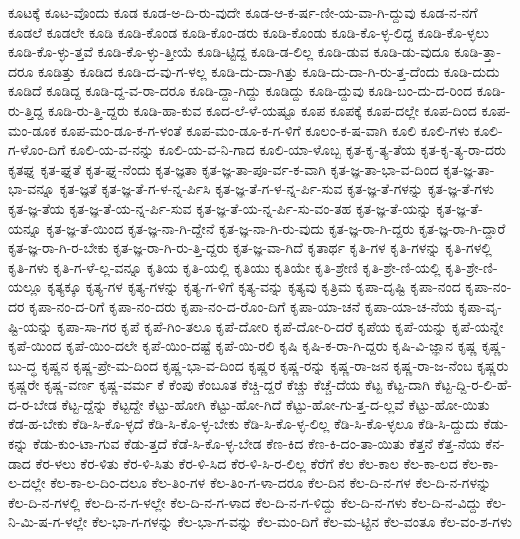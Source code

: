 {ಕೂಟಕ್ಕೆ
ಕೂಟ-ವೊಂದು
ಕೂಡ
ಕೂಡ-ಅ-ದಿ-ರು-ವುದೇ
ಕೂಡ-ಆ-ಕ-ರ್ಷ-ಣೀ-ಯ-ವಾ-ಗಿ-ದ್ದುವು
ಕೂಡ-ನ-ನಗೆ
ಕೂಡಲೆ
ಕೂಡಲೇ
ಕೂಡಿ
ಕೂಡಿ-ಕೊಂಡ
ಕೂಡಿ-ಕೊಂ-ಡರು
ಕೂಡಿ-ಕೊಂಡು
ಕೂಡಿ-ಕೊ-ಳ್ಳ-ಲಿದ್ದ
ಕೂಡಿ-ಕೊ-ಳ್ಳಲು
ಕೂಡಿ-ಕೊ-ಳ್ಳು-ತ್ತವೆ
ಕೂಡಿ-ಕೊ-ಳ್ಳು-ತ್ತೀಯೆ
ಕೂಡಿ-ಟ್ಟಿದ್ದ
ಕೂಡಿ-ಡ-ಲಿಲ್ಲ
ಕೂಡಿ-ಡುವ
ಕೂಡಿ-ಡು-ವುದೂ
ಕೂಡಿ-ತ್ತಾ-ದರೂ
ಕೂಡಿತ್ತು
ಕೂಡಿದ
ಕೂಡಿ-ದ-ವು-ಗ-ಳಲ್ಲ
ಕೂಡಿ-ದು-ದಾ-ಗಿತ್ತು
ಕೂಡಿ-ದು-ದಾ-ಗಿ-ರು-ತ್ತ-ದೆಂದು
ಕೂಡಿ-ದುದು
ಕೂಡಿದೆ
ಕೂಡಿದ್ದ
ಕೂಡಿ-ದ್ದ-ವ-ರಾ-ದರೂ
ಕೂಡಿ-ದ್ದಾ-ಗಿದ್ದು
ಕೂಡಿದ್ದು
ಕೂಡಿ-ದ್ದುವು
ಕೂಡಿ-ಬಂ-ದು-ದ-ರಿಂದ
ಕೂಡಿ-ರು-ತ್ತಿದ್ದ
ಕೂಡಿ-ರು-ತ್ತಿ-ದ್ದರು
ಕೂಡಿ-ಹಾ-ಕುವ
ಕೂದ-ಲೆ-ಳೆ-ಯಷ್ಟೂ
ಕೂಪ
ಕೂಪಕ್ಕೆ
ಕೂಪ-ದಲ್ಲೇ
ಕೂಪ-ದಿಂದ
ಕೂಪ-ಮಂ-ಡೂಕ
ಕೂಪ-ಮಂ-ಡೂ-ಕ-ಗ-ಳಂತೆ
ಕೂಪ-ಮಂ-ಡೂ-ಕ-ಗ-ಳಿಗೆ
ಕೂಲಂ-ಕ-ಷ-ವಾಗಿ
ಕೂಲಿ
ಕೂಲಿ-ಗಳು
ಕೂಲಿ-ಗ-ಳೊಂ-ದಿಗೆ
ಕೂಲಿ-ಯ-ವ-ನನ್ನು
ಕೂಲಿ-ಯ-ವ-ನಿ-ಗಾದ
ಕೂಲಿ-ಯಾ-ಳೊಬ್ಬ
ಕೃತ-ಕೃ-ತ್ಯ-ತೆಯ
ಕೃತ-ಕೃ-ತ್ಯ-ರಾ-ದರು
ಕೃತಘ್ನ
ಕೃತ-ಘ್ನತೆ
ಕೃತ-ಘ್ನ-ನೆಂದು
ಕೃತ-ಜ್ಞತಾ
ಕೃತ-ಜ್ಞ-ತಾ-ಪೂ-ರ್ವ-ಕ-ವಾಗಿ
ಕೃತ-ಜ್ಞ-ತಾ-ಭಾ-ವ-ದಿಂದ
ಕೃತ-ಜ್ಞ-ತಾ-ಭಾ-ವನ್ನೂ
ಕೃತ-ಜ್ಞತೆ
ಕೃತ-ಜ್ಞ-ತೆ-ಗ-ಳ-ನ್ನ-ರ್ಪಿಸಿ
ಕೃತ-ಜ್ಞ-ತೆ-ಗ-ಳ-ನ್ನ-ರ್ಪಿ-ಸುವ
ಕೃತ-ಜ್ಞ-ತೆ-ಗಳನ್ನು
ಕೃತ-ಜ್ಞ-ತೆ-ಗಳು
ಕೃತ-ಜ್ಞ-ತೆಯ
ಕೃತ-ಜ್ಞ-ತೆ-ಯ-ನ್ನ-ರ್ಪಿ-ಸುವ
ಕೃತ-ಜ್ಞ-ತೆ-ಯ-ನ್ನ-ರ್ಪಿ-ಸು-ವಂ-ತಹ
ಕೃತ-ಜ್ಞ-ತೆ-ಯನ್ನು
ಕೃತ-ಜ್ಞ-ತೆ-ಯನ್ನೂ
ಕೃತ-ಜ್ಞ-ತೆ-ಯಿಂದ
ಕೃತ-ಜ್ಞ-ನಾ-ಗಿ-ದ್ದೇನೆ
ಕೃತ-ಜ್ಞ-ನಾ-ಗಿ-ರು-ವುದು
ಕೃತ-ಜ್ಞ-ರಾ-ಗಿ-ದ್ದರು
ಕೃತ-ಜ್ಞ-ರಾ-ಗಿ-ದ್ದಾರೆ
ಕೃತ-ಜ್ಞ-ರಾ-ಗಿ-ರ-ಬೇಕು
ಕೃತ-ಜ್ಞ-ರಾ-ಗಿ-ರು-ತ್ತಿ-ದ್ದರು
ಕೃತ-ಜ್ಞ-ವಾ-ಗಿದೆ
ಕೃತಾರ್ಥ
ಕೃತಿ-ಗಳ
ಕೃತಿ-ಗಳನ್ನು
ಕೃತಿ-ಗಳಲ್ಲಿ
ಕೃತಿ-ಗಳು
ಕೃತಿ-ಗ-ಳೆ-ಲ್ಲ-ವನ್ನೂ
ಕೃತಿಯ
ಕೃತಿ-ಯಲ್ಲಿ
ಕೃತಿಯು
ಕೃತಿಯೇ
ಕೃತಿ-ಶ್ರೇಣಿ
ಕೃತಿ-ಶ್ರೇ-ಣಿ-ಯಲ್ಲಿ
ಕೃತಿ-ಶ್ರೇ-ಣಿ-ಯಲ್ಲೂ
ಕೃತ್ಯಕ್ಕೂ
ಕೃತ್ಯ-ಗಳ
ಕೃತ್ಯ-ಗಳನ್ನು
ಕೃತ್ಯ-ಗ-ಳಿಗೆ
ಕೃತ್ಯ-ವನ್ನು
ಕೃತ್ಯವು
ಕೃತ್ರಿಮ
ಕೃಪಾ-ದೃಷ್ಟಿ
ಕೃಪಾ-ನಂದ
ಕೃಪಾ-ನಂ-ದರ
ಕೃಪಾ-ನಂ-ದ-ರಿಗೆ
ಕೃಪಾ-ನಂ-ದರು
ಕೃಪಾ-ನಂ-ದ-ರೊಂ-ದಿಗೆ
ಕೃಪಾ-ಯಾ-ಚನೆ
ಕೃಪಾ-ಯಾ-ಚ-ನೆಯ
ಕೃಪಾ-ವೃ-ಷ್ಟಿ-ಯನ್ನು
ಕೃಪಾ-ಸಾ-ಗರ
ಕೃಪೆ
ಕೃಪೆ-ಗಿಂ-ತಲೂ
ಕೃಪೆ-ದೋರಿ
ಕೃಪೆ-ದೋ-ರಿ-ದರೆ
ಕೃಪೆಯ
ಕೃಪೆ-ಯನ್ನು
ಕೃಪೆ-ಯನ್ನೇ
ಕೃಪೆ-ಯಿಂದ
ಕೃಪೆ-ಯಿಂ-ದಲೇ
ಕೃಪೆ-ಯಿಂ-ದಷ್ಟೆ
ಕೃಪೆ-ಯಿ-ರಲಿ
ಕೃಷಿ
ಕೃಷಿ-ಕ-ರಾ-ಗಿ-ದ್ದರು
ಕೃಷಿ-ವಿ-ಜ್ಞಾನ
ಕೃಷ್ಣ
ಕೃಷ್ಣ-ಬು-ದ್ಧ
ಕೃಷ್ಣನ
ಕೃಷ್ಣ-ಪ್ರೇ-ಮ-ದಿಂದ
ಕೃಷ್ಣ-ಭಾ-ವ-ದಿಂದ
ಕೃಷ್ಣರ
ಕೃಷ್ಣ-ರನ್ನು
ಕೃಷ್ಣ-ರಾ-ಜನ
ಕೃಷ್ಣ-ರಾ-ಜ-ನೆಂಬ
ಕೃಷ್ಣರು
ಕೃಷ್ಣರೇ
ಕೃಷ್ಣ-ವರ್ಣ
ಕೃಷ್ಣ-ವರ್ಮ
ಕೆ
ಕೆಂಪು
ಕೆಂಬೂತ
ಕೆಚ್ಚಿ-ದ್ದರೆ
ಕೆಚ್ಚು
ಕೆಚ್ಚೆ-ದೆಯ
ಕೆಟ್ಟ
ಕೆಟ್ಟ-ದಾಗಿ
ಕೆಟ್ಟ-ದ್ದಿ-ರ-ಲಿ-ಹೆ-ದ-ರ-ಬೇಡ
ಕೆಟ್ಟ-ದ್ದೆನ್ನು
ಕೆಟ್ಟದ್ದೇ
ಕೆಟ್ಟು-ಹೋಗಿ
ಕೆಟ್ಟು-ಹೋ-ಗಿದೆ
ಕೆಟ್ಟು-ಹೋ-ಗು-ತ್ತ-ದ-ಲ್ಲವೆ
ಕೆಟ್ಟು-ಹೋ-ಯಿತು
ಕೆಡ-ಹ-ಬೇಕು
ಕೆಡಿ-ಸಿ-ಕೊ-ಳ್ಳದೆ
ಕೆಡಿ-ಸಿ-ಕೊ-ಳ್ಳ-ಬೇಕು
ಕೆಡಿ-ಸಿ-ಕೊ-ಳ್ಳ-ಲಿಲ್ಲ
ಕೆಡಿ-ಸಿ-ಕೊ-ಳ್ಳಲೂ
ಕೆಡಿ-ಸಿ-ದ್ದುದು
ಕೆಡು-ಕನ್ನು
ಕೆಡು-ಕುಂ-ಟಾ-ಗುವ
ಕೆಡು-ತ್ತದೆ
ಕೆಡೆ-ಸಿ-ಕೊ-ಳ್ಳ-ಬೇಡ
ಕೆಣ-ಕಿದ
ಕೆಣ-ಕಿ-ದಂ-ತಾ-ಯಿತು
ಕೆತ್ತನೆ
ಕೆತ್ತ-ನೆಯ
ಕೆನ-ಡಾದ
ಕೆರ-ಳಲು
ಕೆರ-ಳಿತು
ಕೆರ-ಳಿ-ಸಿತು
ಕೆರ-ಳಿ-ಸಿದ
ಕೆರ-ಳಿ-ಸಿ-ರ-ಲಿಲ್ಲ
ಕೆರೆಗೆ
ಕೆಲ
ಕೆಲ-ಕಾಲ
ಕೆಲ-ಕಾ-ಲದ
ಕೆಲ-ಕಾ-ಲ-ದಲ್ಲೇ
ಕೆಲ-ಕಾ-ಲ-ದಿಂ-ದಲೂ
ಕೆಲ-ತಿಂ-ಗಳ
ಕೆಲ-ತಿಂ-ಗ-ಳಾ-ದರೂ
ಕೆಲ-ದಿನ
ಕೆಲ-ದಿ-ನ-ಗಳ
ಕೆಲ-ದಿ-ನ-ಗಳನ್ನು
ಕೆಲ-ದಿ-ನ-ಗಳಲ್ಲಿ
ಕೆಲ-ದಿ-ನ-ಗ-ಳಲ್ಲೇ
ಕೆಲ-ದಿ-ನ-ಗ-ಳಾದ
ಕೆಲ-ದಿ-ನ-ಗ-ಳಿದ್ದು
ಕೆಲ-ದಿ-ನ-ಗಳು
ಕೆಲ-ದಿ-ನ-ವಿದ್ದು
ಕೆಲ-ನಿ-ಮಿ-ಷ-ಗ-ಳಲ್ಲೇ
ಕೆಲ-ಭಾ-ಗ-ಗಳನ್ನು
ಕೆಲ-ಭಾ-ಗ-ವನ್ನು
ಕೆಲ-ಮಂ-ದಿಗೆ
ಕೆಲ-ಮ-ಟ್ಟಿನ
ಕೆಲ-ವಂತೂ
ಕೆಲ-ವಂ-ಶ-ಗಳು
}
